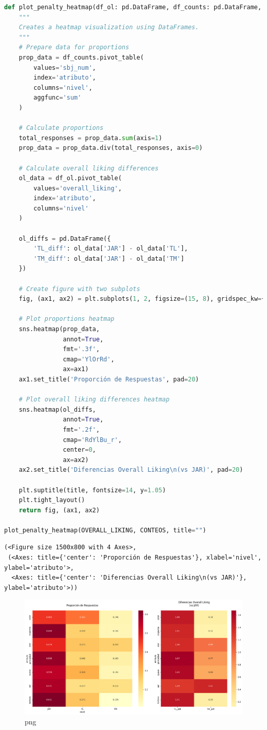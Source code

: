 \begin{lstlisting}[language=Python]
def plot_penalty_heatmap(df_ol: pd.DataFrame, df_counts: pd.DataFrame, title: str = "Penalty Analysis Heatmap"):
    """
    Creates a heatmap visualization using DataFrames.
    """
    # Prepare data for proportions
    prop_data = df_counts.pivot_table(
        values='sbj_num', 
        index='atributo', 
        columns='nivel', 
        aggfunc='sum'
    )
    
    # Calculate proportions
    total_responses = prop_data.sum(axis=1)
    prop_data = prop_data.div(total_responses, axis=0)
    
    # Calculate overall liking differences
    ol_data = df_ol.pivot_table(
        values='overall_liking',
        index='atributo',
        columns='nivel'
    )
    
    ol_diffs = pd.DataFrame({
        'TL_diff': ol_data['JAR'] - ol_data['TL'],
        'TM_diff': ol_data['JAR'] - ol_data['TM']
    })
    
    # Create figure with two subplots
    fig, (ax1, ax2) = plt.subplots(1, 2, figsize=(15, 8), gridspec_kw={'width_ratios': [1.5, 1]})
    
    # Plot proportions heatmap
    sns.heatmap(prop_data, 
                annot=True, 
                fmt='.3f',
                cmap='YlOrRd',
                ax=ax1)
    ax1.set_title('Proporción de Respuestas', pad=20)
    
    # Plot overall liking differences heatmap
    sns.heatmap(ol_diffs,
                annot=True,
                fmt='.2f',
                cmap='RdYlBu_r',
                center=0,
                ax=ax2)
    ax2.set_title('Diferencias Overall Liking\n(vs JAR)', pad=20)
    
    plt.suptitle(title, fontsize=14, y=1.05)
    plt.tight_layout()
    return fig, (ax1, ax2)

plot_penalty_heatmap(OVERALL_LIKING, CONTEOS, title="")
\end{lstlisting}

\begin{lstlisting}
(<Figure size 1500x800 with 4 Axes>,
 (<Axes: title={'center': 'Proporción de Respuestas'}, xlabel='nivel', ylabel='atributo'>,
  <Axes: title={'center': 'Diferencias Overall Liking\n(vs JAR)'}, ylabel='atributo'>))
\end{lstlisting}

\begin{figure}
\centering
\includegraphics{implementation_files/implementation_8_1.png}
\caption{png}
\end{figure}

